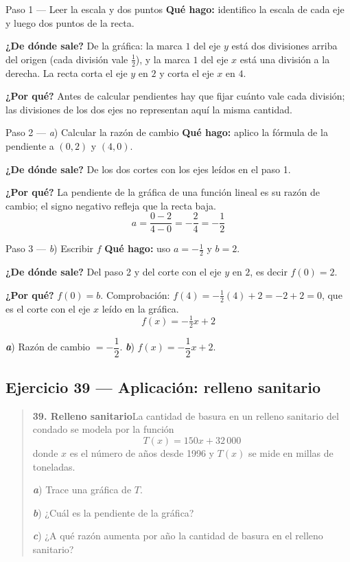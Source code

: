 \documentclass[11pt]{article}
\begin{document}
\begin{paso}{Paso 1 --- Leer la escala y dos puntos}
\textbf{Qué hago:} identifico la escala de cada eje y luego dos puntos de la recta.

\textbf{¿De dónde sale?} De la gráfica: la marca $1$ del eje $y$ está dos divisiones arriba del origen (cada división vale $\tfrac12$), y la marca $1$ del eje $x$ está una división a la derecha. La recta corta el eje $y$ en $2$ y corta el eje $x$ en $4$.

\textbf{¿Por qué?} Antes de calcular pendientes hay que fijar cuánto vale cada división; las divisiones de los dos ejes no representan aquí la misma cantidad.
\end{paso}

\begin{paso}{Paso 2 --- \textit{a}) Calcular la razón de cambio}
\textbf{Qué hago:} aplico la fórmula de la pendiente a $(0,2)$ y $(4,0)$.

\textbf{¿De dónde sale?} De los dos cortes con los ejes leídos en el paso 1.

\textbf{¿Por qué?} La pendiente de la gráfica de una función lineal es su razón de cambio; el signo negativo refleja que la recta baja.
\[
a=\frac{0-2}{4-0}=-\frac{2}{4}=-\frac12
\]
\end{paso}

\begin{paso}{Paso 3 --- \textit{b}) Escribir $f$}
\textbf{Qué hago:} uso $a=-\tfrac12$ y $b=2$.

\textbf{¿De dónde sale?} Del paso 2 y del corte con el eje $y$ en $2$, es decir $f(0)=2$.

\textbf{¿Por qué?} $f(0)=b$. Comprobación: $f(4)=-\tfrac12(4)+2=-2+2=0$, que es el corte con el eje $x$ leído en la gráfica.
\[
f(x)=-\tfrac12 x+2
\]
\end{paso}

\begin{resp}
\textbf{\textit{a}}) Razón de cambio $=-\dfrac12$. \quad \textbf{\textit{b}}) $f(x)=-\dfrac{1}{2}x+2$.
\end{resp}

\subsection*{Ejercicio 39 — Aplicación: relleno sanitario}

\begin{quote}
\textbf{39. Relleno sanitario}\quad La cantidad de basura en un relleno sanitario del condado se modela por la función
\[
T(x)=150x+32\,000
\]
donde $x$ es el número de años desde 1996 y $T(x)$ se mide en millas de toneladas.

\textbf{\textit{a}}) Trace una gráfica de $T$.

\textbf{\textit{b}}) ¿Cuál es la pendiente de la gráfica?

\textbf{\textit{c}}) ¿A qué razón aumenta por año la cantidad de basura en el relleno sanitario?
\end{quote}
\end{document}

